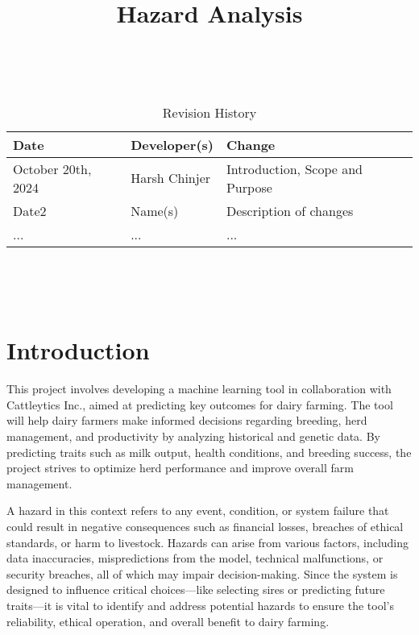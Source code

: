 \documentclass{article}
\title{Hazard Analysis\\\progname}
\author{\authname}
\date{}
\begin{document}
\maketitle
\thispagestyle{empty}

~\newpage


\begin{table}[hp]
\caption{Revision History} \label{TblRevisionHistory}
\begin{tabularx}{\textwidth}{llX}
\toprule
\textbf{Date} & \textbf{Developer(s)} & \textbf{Change}\\
\midrule
October 20th, 2024 & Harsh Chinjer & Introduction, Scope and Purpose\\
Date2 & Name(s) & Description of changes\\
... & ... & ...\\
\bottomrule
\end{tabularx}
\end{table}

~\newpage

\tableofcontents

~\newpage



\section{Introduction}

This project involves developing a machine learning tool in collaboration with
Cattleytics Inc., aimed at predicting key outcomes for dairy farming. The tool
will help dairy farmers make informed decisions regarding breeding, herd
management, and productivity by analyzing historical and genetic data. By
predicting traits such as milk output, health conditions, and breeding success,
the project strives to optimize herd performance and improve overall farm
management.

A hazard in this context refers to any event, condition, or system failure that
could result in negative consequences such as financial losses, breaches of
ethical standards, or harm to livestock. Hazards can arise from various factors,
including data inaccuracies, mispredictions from the model, technical
malfunctions, or security breaches, all of which may impair decision-making.
Since the system is designed to influence critical choices—like selecting sires
or predicting future traits—it is vital to identify and address potential
hazards to ensure the tool’s reliability, ethical operation, and overall benefit
to dairy farming.
\end{document}
